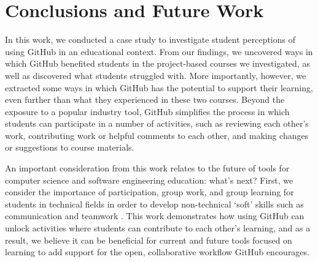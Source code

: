 \section{Conclusions and Future Work}



In this work, we conducted a case study to investigate student perceptions of using GitHub in an educational context. From our findings, we uncovered ways in which GitHub benefited students in the project-based courses we investigated, as well as discovered what students struggled with. More importantly, however, we extracted some ways in which GitHub has the potential to support their learning, even further than what they experienced in these two courses. Beyond the exposure to a popular industry tool, GitHub simplifies the process in which students can participate in a number of activities, such as reviewing each other's work, contributing work or helpful comments to each other, and making changes or suggestions to course materials.

An important consideration from this work relates to the future of tools for computer science and software engineering education: what's next? First, we consider the importance of participation, group work, and group learning for students in technical fields in order to develop non-technical `soft' skills such as communication and teamwork \cite{jazayeri2004education}. This work demonstrates how using GitHub can unlock activities where students can contribute to each other's learning, and as a result, we believe it can be beneficial for current and future tools focused on learning to add support for the open, collaborative workflow GitHub encourages.


